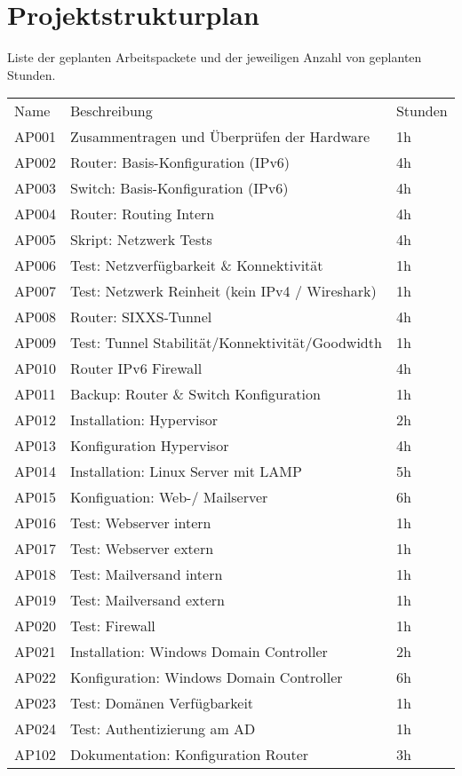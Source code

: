 \section{Projektstrukturplan}

Liste der geplanten Arbeitspackete und der jeweiligen Anzahl von geplanten Stunden.\\
\noindent \begin{tabular}{|l|l|l|}
\hline
Name & Beschreibung & Stunden \\
AP001 & Zusammentragen und Überprüfen der Hardware & 1h\\
AP002 & Router: Basis-Konfiguration (IPv6) & 4h\\
AP003 & Switch: Basis-Konfiguration (IPv6) & 4h\\
AP004 & Router: Routing Intern & 4h\\
AP005 & Skript: Netzwerk Tests & 4h\\
AP006 & Test: Netzverfügbarkeit \& Konnektivität & 1h\\
AP007 & Test: Netzwerk Reinheit (kein IPv4 / Wireshark) & 1h\\
AP008 & Router: SIXXS-Tunnel & 4h\\
AP009 & Test: Tunnel Stabilität/Konnektivität/Goodwidth & 1h\\
AP010 & Router IPv6 Firewall & 4h\\
AP011 & Backup: Router \& Switch Konfiguration & 1h\\
AP012 & Installation: Hypervisor & 2h\\
AP013 & Konfiguration Hypervisor & 4h\\
AP014 & Installation: Linux Server mit LAMP & 5h\\
AP015 & Konfiguation: Web-/ Mailserver & 6h\\
AP016 & Test: Webserver intern & 1h\\
AP017 & Test: Webserver extern & 1h\\
AP018 & Test: Mailversand intern & 1h\\
AP019 & Test: Mailversand extern & 1h\\
AP020 & Test: Firewall & 1h\\
AP021 & Installation: Windows Domain Controller & 2h\\
AP022 & Konfiguration: Windows Domain Controller & 6h\\
AP023 & Test: Domänen Verfügbarkeit & 1h\\
AP024 & Test: Authentizierung am AD & 1h\\
AP102 & Dokumentation: Konfiguration Router & 3h\\

\end{tabular}
